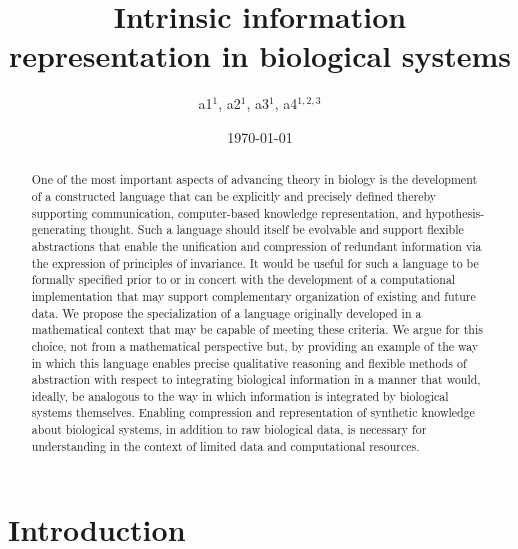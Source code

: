 \documentclass[aps,twocolumn]{revtex4-1}
\begin{document}
 

\title{\bf Intrinsic information representation in biological systems}

\author{a1$^{1}$, a2$^{1}$, a3$^{1}$, a4$^{1,2,3}$}


\date{\today}
\begin{abstract}
One of the most important aspects of advancing theory in biology is the development of a constructed language that can be explicitly and precisely defined thereby supporting communication, computer-based knowledge representation, and hypothesis-generating thought. Such a language should itself be evolvable and support flexible abstractions that enable the unification and compression of redundant information via the expression of principles of invariance. It would be useful for such a language to be formally specified prior to or in concert with the development of a computational implementation that may support complementary organization of existing and future data. We propose the specialization of a language originally developed in a mathematical context that may be capable of meeting these criteria. We argue for this choice, not from a mathematical perspective but, by providing an example of the way in which this language enables precise qualitative reasoning and flexible methods of abstraction with respect to integrating biological information in a manner that would, ideally, be analogous to the way in which information is integrated by biological systems themselves. Enabling compression and representation of synthetic knowledge about biological systems, in addition to raw biological data, is necessary for understanding in the context of limited data and computational resources.
\end{abstract}

\maketitle

\tableofcontents

\section{Introduction}
\end{document}
